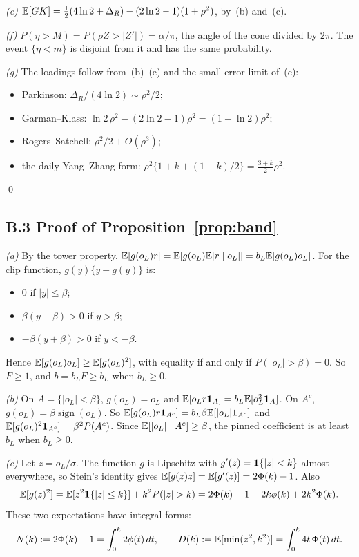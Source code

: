 \emph{(e)} $\mathbb{E}[GK]=\tfrac12(4\ln2+\Delta_R)-(2\ln2-1)(1+\rho^2)$, by~(b) and~(c).

\emph{(f)} $P(\eta>M)=P(\rho Z>|Z'|)=\alpha/\pi$, the angle of the cone divided by $2\pi$. The
event $\{\eta<m\}$ is disjoint from it and has the same probability.

\emph{(g)} The loadings follow from~(b)--(e) and the small-error limit of~(c):
\begin{itemize}
  \item Parkinson: $\Delta_R/(4\ln2)\sim\rho^2/2$;
  \item Garman--Klass: $\ln2\,\rho^2-(2\ln2-1)\rho^2=(1-\ln2)\rho^2$;
  \item Rogers--Satchell: $\rho^2/2+O(\rho^3)$;
  \item the daily Yang--Zhang form: $\rho^2\{1+k+(1-k)/2\}=\tfrac{3+k}{2}\rho^2$.
\end{itemize}
\qed

\subsection*{B.3 Proof of Proposition~\ref{prop:band}}

\emph{(a)} By the tower property, $\mathbb{E}[g(o_L)r]=\mathbb{E}[g(o_L)\mathbb{E}[r\mid o_L]]=b_L\mathbb{E}[g(o_L)o_L]$. For the
clip function, $g(y)\{y-g(y)\}$ is:
\begin{itemize}
  \item $0$ if $|y|\le\beta$;
  \item $\beta(y-\beta)>0$ if $y>\beta$;
  \item $-\beta(y+\beta)>0$ if $y<-\beta$.
\end{itemize}
Hence $\mathbb{E}[g(o_L)o_L]\ge\mathbb{E}[g(o_L)^2]$, with equality if and only if $P(|o_L|>\beta)=0$. So
$F\ge1$, and $b=b_LF\ge b_L$ when $b_L\ge0$.

\emph{(b)} On $A=\{|o_L|<\beta\}$, $g(o_L)=o_L$ and $\mathbb{E}[o_Lr\mathbf{1}_A]=b_L\mathbb{E}[o_L^2\mathbf{1}_A]$. On $A^c$,
$g(o_L)=\beta\operatorname{sign}(o_L)$. So $\mathbb{E}[g(o_L)r\mathbf{1}_{A^c}]=b_L\beta\mathbb{E}[|o_L|\mathbf{1}_{A^c}]$ and
$\mathbb{E}[g(o_L)^2\mathbf{1}_{A^c}]=\beta^2P(A^c)$. Since $\mathbb{E}[|o_L|\mid A^c]\ge\beta$, the pinned coefficient
is at least $b_L$ when $b_L\ge0$.

\emph{(c)} Let $z=o_L/\sigma$. The function $g$ is Lipschitz with $g'(z)=\mathbf{1}\{|z|<k\}$ almost
everywhere, so Stein's identity \citep{Stein1981} gives $\mathbb{E}[g(z)z]=\mathbb{E}[g'(z)]=2\Phi(k)-1$. Also
\[
  \E[g(z)^2]=\E[z^2\ind\{|z|\le k\}]+k^2P(|z|>k)=2\Phi(k)-1-2k\phi(k)+2k^2\Phibar(k).
\]
These two expectations have integral forms:
\[
  N(k):=2\Phi(k)-1=\int_0^k2\phi(t)\,dt,\qquad D(k):=\mathbb{E}[\min(z^2,k^2)]=\int_0^k4t\,\bar\Phi(t)\,dt.
\]

